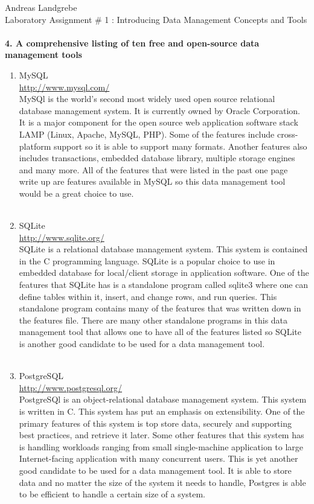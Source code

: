 \documentclass{article}
\begin{document}
\noindent
Andreas Landgrebe
\\
Laboratory Assignment \# 1 : Introducing Data Management Concepts and Tools
\\
\\
\textbf{4. A comprehensive listing of ten free and open-source data management tools}
\begin{enumerate}
\item MySQL
\\
\url{http://www.mysql.com/}
\\
MySQl is the world's second most widely used open source relational database management system. It is currently owned by Oracle Corporation. It is a major component for the open source web application software stack LAMP (Linux, Apache, MySQL, PHP). Some of the features include cross-platform support so it is able to support many formats. Another features also includes transactions, embedded database library, multiple storage engines and many more. All of the features that were listed in the past one page write up are features available in MySQL so this data management tool would be a great choice to use.     
\\
\\
\item SQLite
\\
\url{http://www.sqlite.org/}
\\
SQLite is a relational database management system. This system is contained in the C programming language. SQLite is a popular choice to use in embedded database for local/client storage in application software. One of the features that SQLite has is a standalone program called sqlite3 where one can define tables within it, insert, and change rows, and run queries. This standalone program contains many of the features that was written down in the features file. There are many other standalone programs in this data management tool that allows one to have all of the features listed so SQLite is another good candidate to be used for a data management tool. 
\\
\\
\item PostgreSQL
\\
\url{http://www.postgresql.org/}
\\
PostgreSQl is an object-relational database management system. This system is written in C. This system has put an emphasis on extensibility. One of the primary features of this system is top store data, securely and supporting best practices, and retrieve it later. Some other features that this system has is handling workloads ranging from small single-machine application to large Internet-facing application with many concurrent users. This is yet another good candidate to be used for a data management tool. It is able to store data and no matter the size of the system it needs to handle, Postgres is able to be efficient to handle a certain size of a system. 

\end{enumerate}
\end{document}
